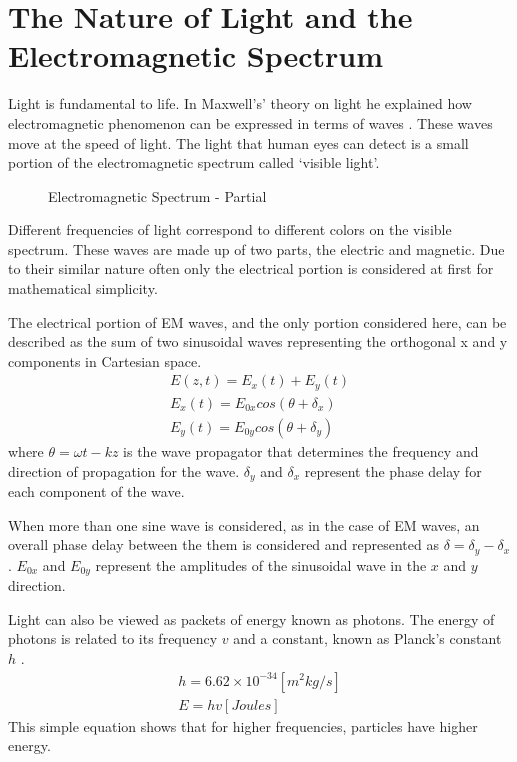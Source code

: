 \section{The Nature of Light and the Electromagnetic Spectrum}
Light is fundamental to life.  In Maxwell’s’ theory on light he explained how electromagnetic phenomenon can be expressed in terms of waves \cite{maxwell}.  These waves move at the speed of light.  The light that human eyes can detect is a small portion of the electromagnetic spectrum called ‘visible light’.
%
\begin{figure}[!htb]
    \begin{center}
    \end{center}
    \caption{Electromagnetic Spectrum - Partial}
    \label{fig:polarization}
\end{figure}
Different frequencies of light correspond to different colors on the visible spectrum.  These waves are made up of two parts, the electric and magnetic.  Due to their similar nature often only the electrical portion is considered at first for mathematical simplicity.

The electrical portion of EM waves, and the only portion considered here, can be described as the sum of two sinusoidal waves representing the orthogonal x and y components in Cartesian space.
%
\begin{align}
    E(z,t)=E_x (t)+E_y (t)\\
    E_x (t)=E_{0x} cos( \theta+\delta_x )\\
    E_y (t)=E_{0y} cos( \theta+\delta_y )
\end{align}
%
where $ \theta = \omega t-kz $ is the wave propagator that determines the frequency and direction of propagation for the wave. $\delta_y$ and $\delta_x $ represent the phase delay for each component of the wave.

When more than one sine wave is considered, as in the case of EM waves, an overall phase delay between the them is considered and represented as $ \delta=\delta_y-\delta_x $. $E_{0x}$ and $E_{0y}$ represent the amplitudes of the sinusoidal wave in the $x$ and $y$ direction.

Light can also be viewed as packets of energy known as photons.  The energy of photons is related to its frequency $v$ and a constant, known as Planck’s constant $h$ \cite{ecophysiology}.
%
\begin{align}
	h=6.62\times10^{-34} [m^2 kg/s]\\
	E=hv [Joules]
\end{align}
%
This simple equation shows that for higher frequencies, particles have higher energy.

